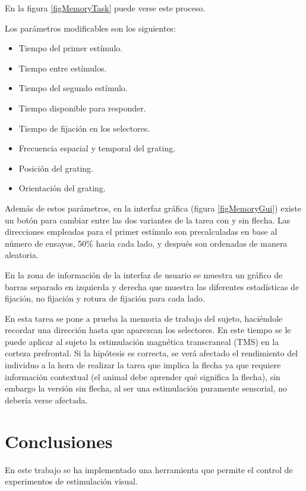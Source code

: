 \documentclass[conference]{IEEEtran}
\begin{document}
En la figura \ref{figMemoryTask} puede verse este proceso. 


Los parámetros modificables son los siguientes:

\begin{itemize}
	\item Tiempo del primer estímulo.
	\item Tiempo entre estímulos.
	\item Tiempo del segundo estímulo.
	\item Tiempo disponible para responder.
	\item Tiempo de fijación en los selectores.
	\item Frecuencia espacial y temporal del grating.
	\item Posición del grating.
	\item Orientación del grating.

\end{itemize}


Además de estos parámetros, en la interfaz gráfica (figura \ref{figMemoryGui}) existe un botón para cambiar entre las dos variantes de la tarea con y sin flecha.
Las direcciones empleadas para el primer estímulo son precalculadas en base al número de ensayos, 50\% hacia cada lado, y después son ordenadas de manera aleatoria.

En la zona de información de la interfaz de usuario se muestra un gráfico de barras separado en izquierda y derecha que muestra las diferentes estadísticas de fijación, no fijación y rotura de fijación para cada lado.


En esta tarea se pone a prueba la memoria de trabajo del sujeto, haciéndole recordar una dirección hasta que aparezcan los selectores. 
En este tiempo se le puede aplicar al sujeto la estimulación magnética transcraneal (TMS) en la corteza prefrontal. Si la hipótesis es correcta, se verá afectado el rendimiento del individuo a la hora de realizar la tarea que implica la flecha ya que requiere información contextual (el animal debe aprender qué significa la flecha), sin embargo la versión sin flecha, al ser una estimulación puramente sensorial, no debería verse afectada.

\section{Conclusiones}

En este trabajo se ha implementado una herramienta que permite el control de experimentos de estimulación visual.
\end{document}
